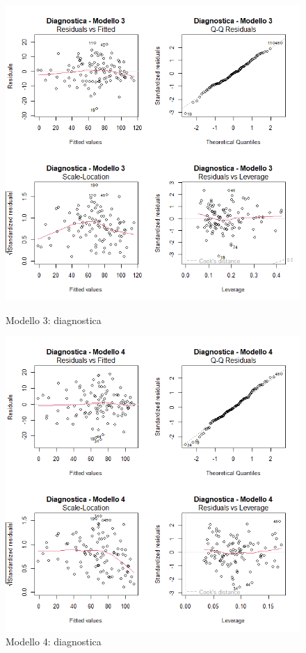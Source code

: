 \begin{figure}[H]
	\centering
	\begin{minipage}{0.48\textwidth}
		\centering
		\includegraphics[width=\linewidth]{../graphs/diagnostica/modello3}
		\caption{Modello 3: diagnostica}
		\label{fig:diagnostica_modello3}
	\end{minipage}
	\hfill
	\begin{minipage}{0.48\textwidth}
		\centering
		\includegraphics[width=\linewidth]{../graphs/diagnostica/modello4}
		\caption{Modello 4: diagnostica}
		\label{fig:diagnostica_modello4}
	\end{minipage}
\end{figure}

